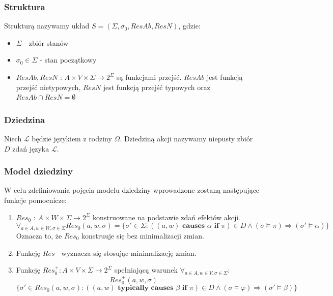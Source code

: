 \documentclass{article}
\begin{document}
\subsubsection{Struktura}
Strukturą nazywamy układ $S=(\Sigma, \sigma_{0}, ResAb, ResN)$, gdzie:
\begin{itemize}
\item $\Sigma$ - zbiór stanów
\item $\sigma_{0} \in \Sigma$ - stan początkowy
\item $ResAb, ResN$ : $A\times V \times \Sigma \to 2^{\Sigma}$ są funkcjami przejść. $ResAb$ jest funkcją przejść nietypowych, $ResN$ jest funkcją przejść typowych oraz $ResAb \cap ResN= \emptyset$ 
\end{itemize}

\subsubsection{Dziedzina}
Niech $\mathcal{L}$ będzie językiem z rodziny $\Omega$. Dziedziną akcji nazywamy niepusty zbiór $D$ zdań języka $\mathcal{L}$.

\subsubsection{Model dziedziny}
W celu zdefiniowania pojęcia modelu dziedziny wprowadzone zostaną następujące funkcje pomocnicze:
\begin{enumerate}
	\item $Res_{0}$ : $A \times W \times \Sigma \to 2^{\Sigma}$ konstruowane na podstawie zdań efektów akcji.
	\[ \forall_{a \in A, w \in W, \sigma \in \Sigma} Res_{0}(a,w,\sigma) = \{\sigma' \in \Sigma: ((a, w) \textbf{ causes } \alpha \textbf{ if } \pi) \in D \land (\sigma \models \pi) \Rightarrow (\sigma' \models \alpha) \}  \]
	Oznacza to, że $Res_{0}$ konstruuje się bez minimalizacji zmian.
	\item Funkcję $Res^{-}$ wyznacza się stosując minimalizację zmian.
	\item Funkcję $Res_{0}^{+} : A \times V \times \Sigma \to 2^{\Sigma}$ spełniającą warunek $\forall_{a \in A, w \in V, \sigma \in \Sigma}$:
	\[ Res_{0}^{+}(a, w,\sigma) = \]
	\[ \{\sigma' \in Res_{0}(a, w,\sigma) : ((a, w) \textbf{ typically causes } \beta \textbf{ if } \pi) \in D \land (\sigma \models \varphi) \Rightarrow (\sigma' \models \beta) \}  \]
\end{enumerate}
\end{document}
